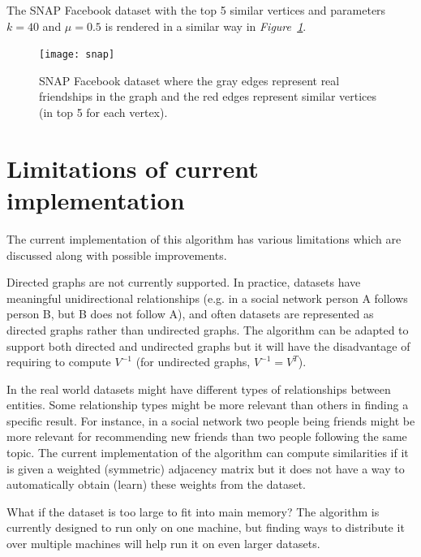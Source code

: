 \documentclass[12pt]{report}
\begin{document}
The SNAP Facebook dataset with the top 5 similar vertices and parameters $k=40$
and $\mu=0.5$ is rendered in a similar way in \emph{Figure~\ref{fig:snap}}.

\begin{figure}[tbp]
  \texttt{[image: snap]}
  \caption{SNAP Facebook dataset where the gray edges represent real friendships
  in the graph and the red edges represent similar vertices (in top 5 for each
  vertex).}
  \label{fig:snap}
\end{figure}

%
%
\section{Limitations of current implementation}
%
The current implementation of this algorithm has various limitations which are
discussed along with possible improvements.


Directed graphs are not currently supported. In practice, datasets have meaningful
unidirectional relationships (e.g. in a social network person A follows person B,
but B does not follow A), and often datasets are represented as directed graphs
rather than undirected graphs. The algorithm can be adapted to support both directed
and undirected graphs but it will have the disadvantage of requiring to compute
$V^{-1}$ (for undirected graphs, $V^{-1} = V^T$).


In the real world datasets might have different types of relationships between
entities. Some relationship types might be more relevant than others in finding
a specific result. For instance, in a social network two people being friends
might be more relevant for recommending new friends than two people following the
same topic. The current implementation of the algorithm can compute similarities
if it is given a weighted (symmetric) adjacency matrix but it does not have a
way to automatically obtain (learn) these weights from the dataset.


What if the dataset is too large to fit into main memory? The algorithm is
currently designed to run only on one machine, but finding ways to distribute it
over multiple machines will help run it on even larger datasets.

%
%
\end{document}
